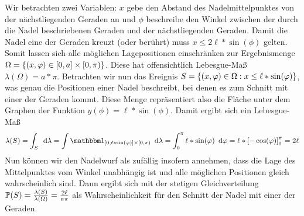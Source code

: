 \begin{exercisePage}
	Wir betrachten zwei Variablen: $x$ gebe den Abstand des Nadelmittelpunktes von der nächstliegenden Geraden an und $\phi$ beschreibe den Winkel zwischen der durch die Nadel beschriebenen Geraden und der nächstliegenden Geraden. Damit die Nadel eine der Geraden kreuzt (oder berührt) muss $x \leq 2\ell * \sin(\phi)$ gelten. Somit lassen sich alle möglichen Lagepositionen einschränken zur Ergebnismenge $\Omega = \menge{(x,\phi) \in [0,a] \times [0,\pi)}$. Diese hat offensichtlich Lebesgue-Maß $\lambda(\Omega) = a*\pi$.
	Betrachten wir nun das Ereignis $S = \menge{(x,\phi) \in \Omega : x \leq \ell * \sin(\phi)}$, was genau die Positionen einer Nadel beschreibt, bei denen es zum Schnitt mit einer der Geraden kommt. Diese Menge repräsentiert also die Fläche unter dem Graphen der Funktion $y(\phi) = \ell * \sin(\phi)$. Damit ergibt sich ein Lebesgue-Maß
	\begin{equation*}
		\lambda(S) = \int_S \diff{\lambda} 
		= \int \one_{[0,\ell*\sin(\phi)] \times [0,\pi)} \diff{\lambda}
		= \int_0^\pi \ell * \sin(\phi) \diff{\phi}
		= \ell * \left[ - \cos(\phi) \right]_0^\pi = 2\ell
	\end{equation*}
	Nun können wir den Nadelwurf als zufällig insofern annehmen, dass die Lage des Mittelpunktes vom Winkel unabhängig ist und alle möglichen Positionen gleich wahrscheinlich sind.
	Dann ergibt sich mit der stetigen Gleichverteilung $\P(S) = \frac{\lambda(S)}{\lambda(\Omega)} = \frac{2\ell}{a\pi}$ als Wahrscheinlichkeit für den Schnitt der Nadel mit einer der Geraden.

\end{exercisePage}